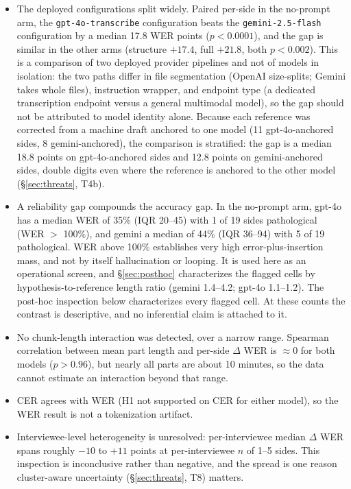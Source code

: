 \documentclass[11pt]{article}
\begin{document}
\begin{itemize}
\item The deployed configurations split widely. Paired per-side in the no-prompt arm, the \texttt{gpt-4o-transcribe} configuration beats the \texttt{gemini-2.5-flash} configuration by a median 17.8 WER points ($p < 0.0001$), and the gap is similar in the other arms (structure $+17.4$, full $+21.8$, both $p < 0.002$). This is a comparison of two deployed provider pipelines and not of models in isolation: the two paths differ in file segmentation (OpenAI size-splits; Gemini takes whole files), instruction wrapper, and endpoint type (a dedicated transcription endpoint versus a general multimodal model), so the gap should not be attributed to model identity alone. Because each reference was corrected from a machine draft anchored to one model (11 gpt-4o-anchored sides, 8 gemini-anchored), the comparison is stratified: the gap is a median 18.8 points on gpt-4o-anchored sides and 12.8 points on gemini-anchored sides, double digits even where the reference is anchored to the other model (\S\ref{sec:threats}, T4b).
\item A reliability gap compounds the accuracy gap. In the no-prompt arm, gpt-4o has a median WER of 35\% (IQR 20--45) with 1 of 19 sides pathological (WER $>$ 100\%), and gemini a median of 44\% (IQR 36--94) with 5 of 19 pathological. WER above 100\% establishes very high error-plus-insertion mass, and not by itself hallucination or looping. It is used here as an operational screen, and \S\ref{sec:posthoc} characterizes the flagged cells by hypothesis-to-reference length ratio (gemini 1.4--4.2; gpt-4o 1.1--1.2). The post-hoc inspection below characterizes every flagged cell. At these counts the contrast is descriptive, and no inferential claim is attached to it.
\item No chunk-length interaction was detected, over a narrow range. Spearman correlation between mean part length and per-side $\Delta$ WER is ${\approx}0$ for both models ($p > 0.96$), but nearly all parts are about 10 minutes, so the data cannot estimate an interaction beyond that range.
\item CER agrees with WER (H1 not supported on CER for either model), so the WER result is not a tokenization artifact.
\item Interviewee-level heterogeneity is unresolved: per-interviewee median $\Delta$ WER spans roughly $-10$ to $+11$ points at per-interviewee $n$ of 1--5 sides. This inspection is inconclusive rather than negative, and the spread is one reason cluster-aware uncertainty (\S\ref{sec:threats}, T8) matters.
\end{itemize}
\end{document}
